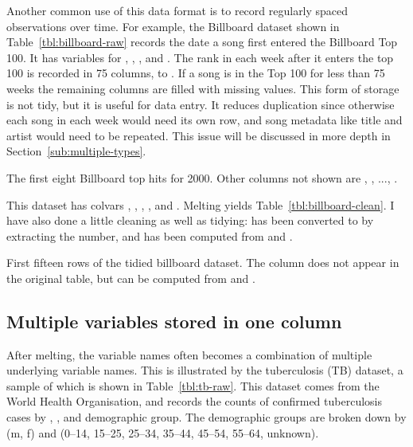 \documentclass[article]{jss}
\begin{document}
Another common use of this data format is to record regularly spaced observations over time. For example, the Billboard dataset shown in Table~\ref{tbl:billboard-raw} records the date a song first entered the Billboard Top 100. It has variables for , , ,  and . The rank in each week after it enters the top 100 is recorded in 75 columns,  to . If a song is in the Top 100 for less than 75 weeks the remaining columns are filled with missing values. This form of storage is not tidy, but it is useful for data entry. It reduces duplication since otherwise each song in each week would need its own row, and song metadata like title and artist would need to be repeated. This issue will be discussed in more depth in Section~\ref{sub:multiple-types}.

\begin{table}[htbp]
  \centering
  
  \caption{The first eight Billboard top hits for 2000. Other columns not shown are , , ..., .}
  \label{tbl:billboard-raw}
\end{table}

This dataset has colvars , , , , and . Melting yields Table~\ref{tbl:billboard-clean}. I have also done a little cleaning as well as tidying:  has been converted to  by extracting the number, and  has been computed from  and .

\begin{table}[htbp]
  \centering
  
  \caption{First fifteen rows of the tidied billboard dataset. The  column does not appear in the original table, but can be computed from  and .}
  \label{tbl:billboard-clean}
\end{table}

\subsection{Multiple variables stored in one column}

After melting, the  variable names often becomes a combination of multiple underlying variable names. This is illustrated by the tuberculosis (TB) dataset, a sample of which is shown in Table~\ref{tbl:tb-raw}. This dataset comes from the World Health Organisation, and records the counts of confirmed tuberculosis cases by , , and demographic group. The demographic groups are broken down by  (m, f) and  (0--14, 15--25, 25--34, 35--44, 45--54, 55--64, unknown). 
\end{document}
